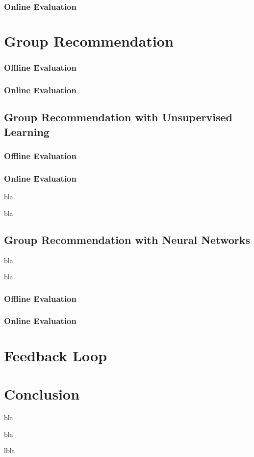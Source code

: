 \subsubsection{Online Evaluation}

\section{Group Recommendation}

\subsubsection{Offline Evaluation}

\subsubsection{Online Evaluation}

\subsection{Group Recommendation with Unsupervised Learning}

\subsubsection{Offline Evaluation}

\subsubsection{Online Evaluation}

bla

bla

\subsection{Group Recommendation with Neural Networks}

bla

bla

\subsubsection{Offline Evaluation}

\subsubsection{Online Evaluation}

\section{Feedback Loop}


\section{Conclusion}

bla

bla 

lbla
